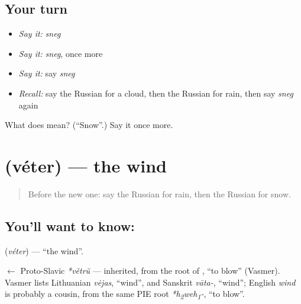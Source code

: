 \subsection*{Your turn}
\begin{itemize}
\raggedright
  \item \emph{Say it:} \emph{sneg}
  \item \emph{Say it:} \emph{sneg}, once more
  \item \emph{Say it:} say \emph{sneg}
  \item \emph{Recall:} say the Russian for a cloud, then the Russian for rain, then say \emph{sneg} again
\end{itemize}

\begin{tcolorbox}[breakable,colback=teal!4,colframe=teal!35!black,title={Before you move on}]
What does  mean? (\textquotedblleft{}Snow\textquotedblright{}.) Say it once more.
\end{tcolorbox}
\section[\texorpdfstring{\ru{ветер} (véter)}{ветер (véter)}]{ (véter) — the wind}

\label{lesson:RU-C59-wind}



\begin{quote}
Before the new one: say the Russian for rain, then the Russian for snow.
\end{quote}

\subsection*{You'll want to know: }
\textbf{} (\emph{véter}) — \textquotedblleft{}the wind\textquotedblright{}.

\begin{cousinweb}
\textbf{} $\leftarrow$ Proto-Slavic \emph{*větrŭ} — inherited, from the root of \emph{}, \textquotedblleft{}to blow\textquotedblright{} (Vasmer). Vasmer lists Lithuanian \emph{vėjas}, \textquotedblleft{}wind\textquotedblright{}, and Sanskrit \emph{vāta-}, \textquotedblleft{}wind\textquotedblright{}; English \emph{wind} is probably a cousin, from the same PIE root \emph{*h\textsubscript{2}weh\textsubscript{1}-}, \textquotedblleft{}to blow\textquotedblright{}.
\end{cousinweb}


